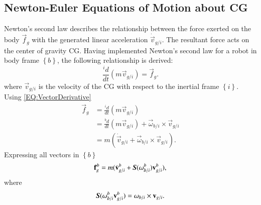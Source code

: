 \subsection{Newton-Euler Equations of Motion about CG}
Newton's second law describes the relationship between the force exerted on the body $\vec{f}_{g}$ with the generated linear acceleration $\dot{\vec{v}}_{g/i}$. The resultant force acts on the center of gravity CG. Having implemented Newton's second law for a robot in body frame $\left\{ b \right\}$, the following relationship is derived: 
\begin{equation}
\frac{^{i}d}{dt}(m\vec{v}_{g/i})=\vec{f}_{g}.
\end{equation}
where $\vec{v}_{g/i}$ is the velocity of the CG with respect to the inertial frame $\left\{ i \right\}$.
Using \ref{EQ:VectorDerivative}
\begin{align}
\vec{f}_{g} &=\frac{^{i}d}{dt}(m\vec{v}_{g/i}) \nonumber \\
&=\frac{^{b}d}{dt}(m\vec{v}_{g/i})+\vec{\omega}_{b/i}\times\vec{v}_{g/i} \nonumber \\
&=m(\dot{\vec{v}}_{g/i}+\vec{\omega}_{b/i}\times \vec{v}_{g/i}).
 \label{EQ:TM6}
 \end{align}
Expressing all vectors in $\left\{ b \right\}$
 \begin{equation}
\vec{f}^{b}_{g}=m(\dot{\vec{v}}_{g/i}^{b}+\emph{\textbf{S}}(\vec{\omega}_{b/i}^{b})\vec{v}^{b}_{g/i}),\label{EQ:TDCG}
 \end{equation}
where
\begin{align}
\emph{\textbf{S}}(\vec{\omega}_{b/i}^{b}\vec{v}^{b}_{g/i})=\vec{\omega}_{b/i}\times \vec{v}_{g/i}.
\end{align}

